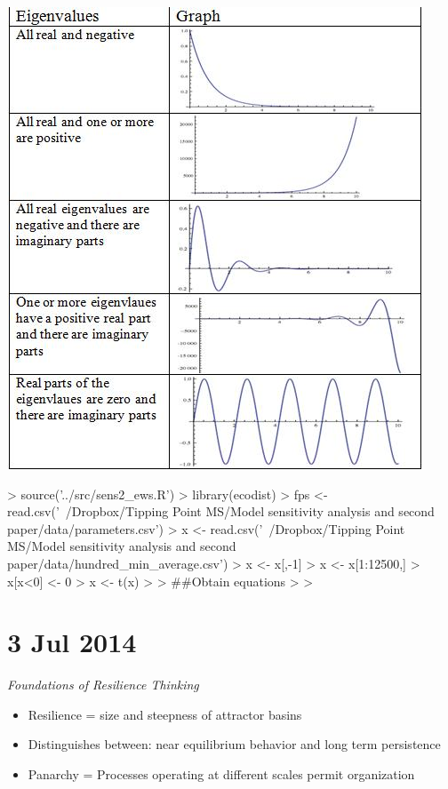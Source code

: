 \documentclass[12pt]{article}
\begin{document}
\includegraphics[]{../docs/Eigenvalue_graphs.jpg}


\begin{Schunk}
\begin{Sinput}
>   source('../src/sens2_ews.R')
> library(ecodist)
> fps <- read.csv('~/Dropbox/Tipping Point MS/Model sensitivity analysis and second paper/data/parameters.csv') 
> x <- read.csv('~/Dropbox/Tipping Point MS/Model sensitivity analysis and second paper/data/hundred_min_average.csv')
> x <- x[,-1]
> x <- x[1:12500,]
> x[x<0] <- 0
> x <- t(x)
> 
> ##Obtain equations
> 
> 
\end{Sinput}
\end{Schunk}

\section{3 Jul 2014}

\textit{Foundations of Resilience Thinking}

\begin{itemize}
\item Resilience = size and steepness of attractor basins
\item Distinguishes between: near equilibrium behavior and long term persistence
\item Panarchy = Processes operating at different scales permit organization
\end{itemize}
\end{document}

